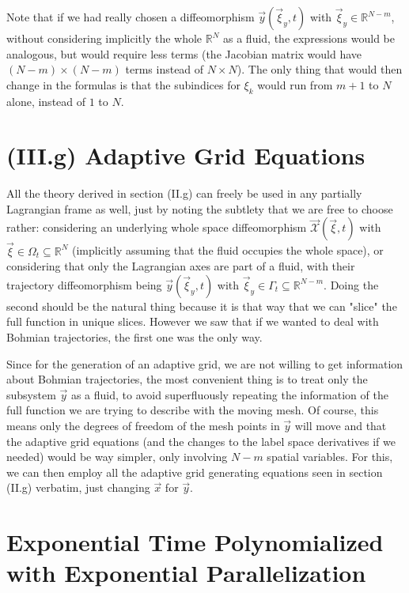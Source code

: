 \documentclass[11pt, a4paper]{article} %
\newcommand{\R}{\mathbb{R}} %
\newcommand{\x}{\mathcal{X}}
\begin{document}
Note that if we had really chosen a diffeomorphism $\vec{y}(\vec{\xi}_y,t)$ with $\vec{\xi}_y\in\R^{N-m}$, without considering implicitly the whole $\R^N$ as a fluid, the expressions would be analogous, but would require less terms (the Jacobian matrix would have $(N-m)\times (N-m)$ terms instead of $N\times N$). The only thing that would then change in the formulas is that the subindices for $\xi_k$ would run from $m+1$ to $N$ alone, instead of $1$ to $N$. 
\vspace{-0.25cm}


\section*{(III.g) Adaptive Grid Equations\vspace{-0.1cm}}
All the theory derived in section (II.g) can freely be used in any partially Lagrangian frame as well, just by noting the subtlety that we are free to choose rather: considering an underlying whole space diffeomorphism $\vec{\x}(\vec{\xi},t)$ with $\vec{\xi}\in\Omega_t\subseteq\R^N$ (implicitly assuming that the fluid occupies the whole space), or considering that only the Lagrangian axes are part of a fluid, with their trajectory diffeomorphism being $\vec{y}(\vec{\xi}_y,t)$ with $\vec{\xi}_y\in\Gamma_t\subseteq\R^{N-m}$. Doing the second should be the natural thing because it is that way that we can "slice" the full function in unique slices. However we saw that if we wanted to deal with Bohmian trajectories, the first one was the only way.

Since for the generation of an adaptive grid, we are not willing to get information about Bohmian trajectories, the most convenient thing is to treat only the subsystem $\vec{y}$ as a fluid, to avoid superfluously repeating the information of the full function we are trying to describe with the moving mesh. Of course, this means only the degrees of freedom of the mesh points in $\vec{y}$ will move and that the adaptive grid equations (and the changes to the label space derivatives if we needed) would be way simpler, only involving $N-m$ spatial variables. For this, we can then employ all the adaptive grid generating equations seen in section (II.g) verbatim, just changing $\vec{x}$ for $\vec{y}$.




\section*{Exponential Time Polynomialized with Exponential Parallelization}
\end{document}
